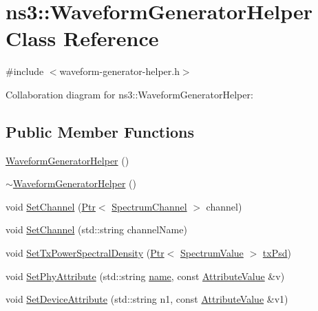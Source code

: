 \hypertarget{classns3_1_1WaveformGeneratorHelper}{}\section{ns3\+:\+:Waveform\+Generator\+Helper Class Reference}
\label{classns3_1_1WaveformGeneratorHelper}


{\ttfamily \#include $<$waveform-\/generator-\/helper.\+h$>$}



Collaboration diagram for ns3\+:\+:Waveform\+Generator\+Helper\+:
\subsection*{Public Member Functions}
\begin{DoxyCompactItemize}
\item 
\hyperlink{classns3_1_1WaveformGeneratorHelper_af66f8154c1f53dd9a538d5b090fb7019}{Waveform\+Generator\+Helper} ()
\item 
\hyperlink{classns3_1_1WaveformGeneratorHelper_a48a23959d50f68e79305fb250ea4eb1b}{$\sim$\+Waveform\+Generator\+Helper} ()
\item 
void \hyperlink{classns3_1_1WaveformGeneratorHelper_a5342430dda9bf0c11725010f09124a56}{Set\+Channel} (\hyperlink{classns3_1_1Ptr}{Ptr}$<$ \hyperlink{classns3_1_1SpectrumChannel}{Spectrum\+Channel} $>$ channel)
\item 
void \hyperlink{classns3_1_1WaveformGeneratorHelper_ab2e318f77288bdf7aacc5793ea4b9292}{Set\+Channel} (std\+::string channel\+Name)
\item 
void \hyperlink{classns3_1_1WaveformGeneratorHelper_a1c76759d1f262edec838f1475893ce70}{Set\+Tx\+Power\+Spectral\+Density} (\hyperlink{classns3_1_1Ptr}{Ptr}$<$ \hyperlink{classns3_1_1SpectrumValue}{Spectrum\+Value} $>$ \hyperlink{lte__link__budget__x2__handover__measures_8m_a684fe3101a5e48a5fcc57cab8dbcd1aa}{tx\+Psd})
\item 
void \hyperlink{classns3_1_1WaveformGeneratorHelper_a93eae78a254e7d32651c7c50e055b1bb}{Set\+Phy\+Attribute} (std\+::string \hyperlink{generate__test__data__lte__spectrum__model_8m_ab74e6bf80237ddc4109968cedc58c151}{name}, const \hyperlink{classns3_1_1AttributeValue}{Attribute\+Value} \&v)
\item 
void \hyperlink{classns3_1_1WaveformGeneratorHelper_a47698bacfa4636148f969685bed61e76}{Set\+Device\+Attribute} (std\+::string n1, const \hyperlink{classns3_1_1AttributeValue}{Attribute\+Value} \&v1)

\end{DoxyCompactItemize}
